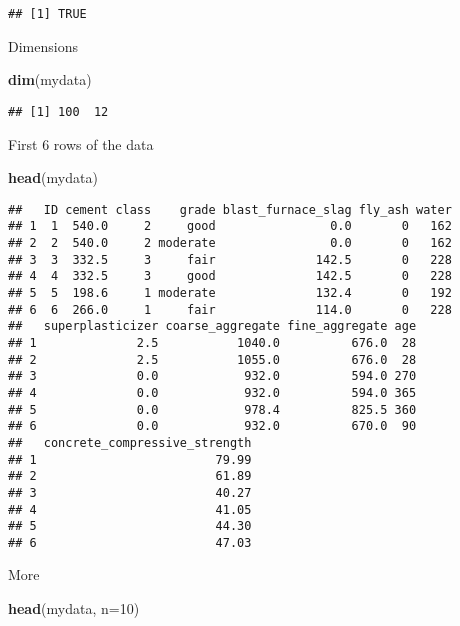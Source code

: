 \documentclass[]{article}
\newenvironment{Shaded}{\begin{snugshade}}{\end{snugshade}}
\newcommand{\DataTypeTok}[1]{\textcolor[rgb]{0.13,0.29,0.53}{#1}}
\newcommand{\DecValTok}[1]{\textcolor[rgb]{0.00,0.00,0.81}{#1}}
\newcommand{\KeywordTok}[1]{\textcolor[rgb]{0.13,0.29,0.53}{\textbf{#1}}}
\newcommand{\NormalTok}[1]{#1}
\begin{document}
\begin{verbatim}
## [1] TRUE
\end{verbatim}

Dimensions

\begin{Shaded}
\begin{Highlighting}[]
\KeywordTok{dim}\NormalTok{(mydata)}
\end{Highlighting}
\end{Shaded}

\begin{verbatim}
## [1] 100  12
\end{verbatim}

First 6 rows of the data

\begin{Shaded}
\begin{Highlighting}[]
\KeywordTok{head}\NormalTok{(mydata)}
\end{Highlighting}
\end{Shaded}

\begin{verbatim}
##   ID cement class    grade blast_furnace_slag fly_ash water
## 1  1  540.0     2     good                0.0       0   162
## 2  2  540.0     2 moderate                0.0       0   162
## 3  3  332.5     3     fair              142.5       0   228
## 4  4  332.5     3     good              142.5       0   228
## 5  5  198.6     1 moderate              132.4       0   192
## 6  6  266.0     1     fair              114.0       0   228
##   superplasticizer coarse_aggregate fine_aggregate age
## 1              2.5           1040.0          676.0  28
## 2              2.5           1055.0          676.0  28
## 3              0.0            932.0          594.0 270
## 4              0.0            932.0          594.0 365
## 5              0.0            978.4          825.5 360
## 6              0.0            932.0          670.0  90
##   concrete_compressive_strength
## 1                         79.99
## 2                         61.89
## 3                         40.27
## 4                         41.05
## 5                         44.30
## 6                         47.03
\end{verbatim}

More

\begin{Shaded}
\begin{Highlighting}[]
\KeywordTok{head}\NormalTok{(mydata, }\DataTypeTok{n=}\DecValTok{10}\NormalTok{)}
\end{Highlighting}
\end{Shaded}
\end{document}
